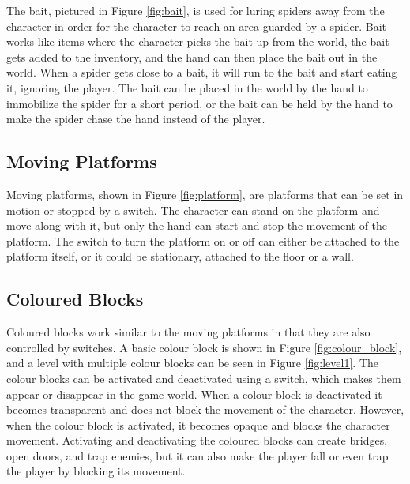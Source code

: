
The bait, pictured in Figure \ref{fig:bait}, is used for luring spiders away from the character in order for the character to reach an area guarded by a spider. Bait works like items where the character picks the bait up from the world, the bait gets added to the inventory, and the hand can then place the bait out in the world. When a spider gets close to a bait, it will run to the bait and start eating it, ignoring the player. The bait can be placed in the world by the hand to immobilize the spider for a short period, or the bait can be held by the hand to make the spider chase the hand instead of the player.

\subsection{Moving Platforms}


Moving platforms, shown in Figure \ref{fig:platform}, are platforms that can be set in motion or stopped by a switch. The character can stand on the platform and move along with it, but only the hand can start and stop the movement of the platform. The switch to turn the platform on or off can either be attached to the platform itself, or it could be stationary, attached to the floor or a wall.

\subsection{Coloured Blocks}


 Coloured blocks work similar to the moving platforms in that they are also controlled by switches. A basic colour block is shown in Figure \ref{fig:colour_block}, and a level with multiple colour blocks can be seen in Figure \ref{fig:level1}. The colour blocks can be activated and deactivated using a switch, which makes them appear or disappear in the game world. When a colour block is deactivated it becomes transparent and does not block the movement of the character. However, when the colour block is activated, it becomes opaque and blocks the character movement. Activating and deactivating the coloured blocks can create bridges, open doors, and trap enemies, but it can also make the player fall or even trap the player by blocking its movement.

